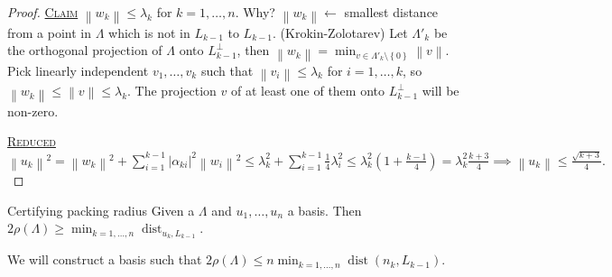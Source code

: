 \documentclass{report}
\def \dist {\operatorname{dist}}
\def \dist {\operatorname{dist}}
\newcommand{\norm}[1]{\left\| #1 \right\|}
\newcommand{\set}[1]{\left\{ #1 \right\}}
\newcommand{\fancyem}[1]{\underline{\textsc{#1}}}
\theoremstyle{definition}
\theoremstyle{remark}
\numberwithin{equation}{section}
\begin{document}
\begin{proof}
    \fancyem{Claim} $\norm{w_k} \leq \lambda_k$ for $k = 1, \ldots, n$. Why? $\norm{w_k} \leftarrow$ smallest distance from a point in $\Lambda$ which is not in $L_{k-1}$ to $L_{k-1}$. (Krokin-Zolotarev) Let $\Lambda'_k$ be the orthogonal projection of $\Lambda$ onto $L_{k-1}^\perp$, then $\norm{w_k} = \min_{v \in \Lambda'_k \setminus \set{0}} \norm{v}$. Pick linearly independent $v_1, \ldots, v_k$ such that $\norm{v_i} \leq \lambda_k$ for $i = 1, \ldots, k$, so $\norm{w_k} \leq \norm{v} \leq \lambda_k$. The projection $v$ of at least one of them onto $L^{\perp}_{k-1}$ will be non-zero.

    \fancyem{Reduced} $\norm{u_k}^2 = \norm{w_k}^2 + \sum_{i=1}^{k-1}|\alpha_{ki}|^2\norm{w_i}^2 \leq \lambda_k^2 + \sum_{i=1}^{k-1} \frac{1}{4}\lambda_i^2 \leq \lambda_k^2\left(1 + \frac{k-1}{4}\right) = \lambda_k^2\frac{k+3}{4} \implies \norm{u_k} \leq \frac{\sqrt{k+3}}{4}.$
\end{proof}

Certifying packing radius
Given a $\Lambda$ and $u_1, \ldots, u_n$ a basis. Then $2 \rho(\Lambda) \geq \min_{k=1, \ldots, n} \dist_{u_k, L_{k-1}}$.

We will construct a basis such that $2 \rho(\Lambda) \leq n \min_{k=1, \ldots, n}\dist(n_k, L_{k-1})$.
\end{document}
